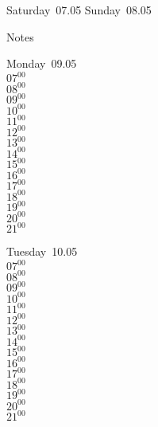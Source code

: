 \documentclass[11pt,a4paper]{book}\usepackage[]{graphicx}\usepackage[]{color}
\begin{document}
\begin{weekendbox}
  Saturday~07.05
  \tcblower
  Sunday~08.05
\end{weekendbox} %
\begin{notebox}
  Notes
\end{notebox}
\clearpage
\begin{headerbox}
\end{headerbox}
\begin{weekdaybox}
  Monday~09.05\\
  { 
  \vfill
  $07^{00}$\\
$08^{00}$\\
$09^{00}$\\
$10^{00}$\\
$11^{00}$\\
$12^{00}$\\
$13^{00}$\\
$14^{00}$\\
$15^{00}$\\
$16^{00}$\\
$17^{00}$\\
$18^{00}$\\
$19^{00}$\\
$20^{00}$\\
$21^{00}$\\
  }
\end{weekdaybox}
\begin{weekdaybox}
  Tuesday~10.05\\
  { 
  \vfill
  $07^{00}$\\
$08^{00}$\\
$09^{00}$\\
$10^{00}$\\
$11^{00}$\\
$12^{00}$\\
$13^{00}$\\
$14^{00}$\\
$15^{00}$\\
$16^{00}$\\
$17^{00}$\\
$18^{00}$\\
$19^{00}$\\
$20^{00}$\\
$21^{00}$\\
  }
\end{weekdaybox}
\end{document}
